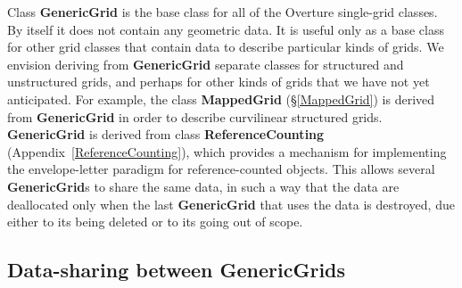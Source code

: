 \documentclass{article}
\begin{document}
Class \textbf{GenericGrid} is the base class for all of the Overture
single-grid classes.  By itself it does not contain any geometric data.
It is useful only as a base class for other grid classes that
contain data to describe particular kinds of grids.  We envision deriving
from \textbf{GenericGrid} separate classes for structured and unstructured
grids, and perhaps for other kinds of grids that we have not yet anticipated.
For example, the class \textbf{MappedGrid} (\S\ref{MappedGrid})
is derived from \textbf{GenericGrid} in order to describe curvilinear
structured grids.  \textbf{GenericGrid} is derived from class
\textbf{ReferenceCounting} (Appendix~\ref{ReferenceCounting}),
which provides a mechanism for implementing the envelope-letter paradigm for
reference-counted objects.  This allows several \textbf{GenericGrid}s to
share the same data, in such a way that the data are deallocated only when
the last \textbf{GenericGrid} that uses the data is destroyed, due either
to its being deleted or to its going out of scope.

\subsection{Data-sharing between \textbf{GenericGrid}s}
\label{GenericGrid:DataSharing}
\end{document}
